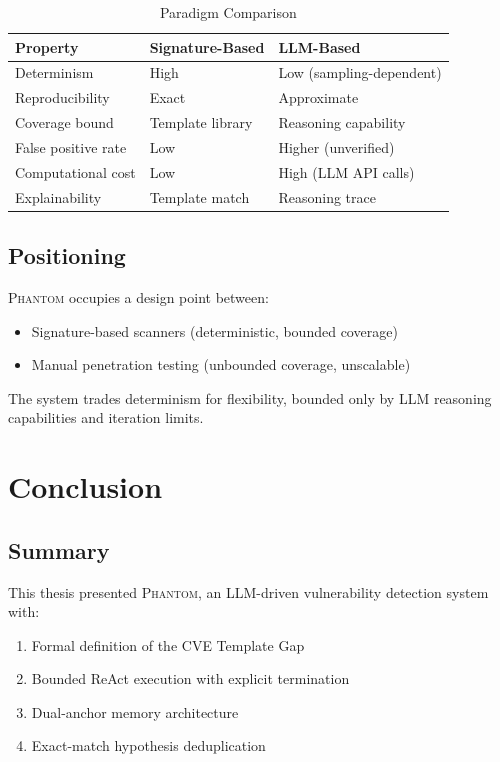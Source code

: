 \documentclass[11pt,a4paper]{article}
\theoremstyle{definition}
\newcommand{\phantom}{\textsc{Phantom}}
\begin{document}
\begin{table}[H]
\centering
\caption{Paradigm Comparison}
\label{tab:comparison}
\begin{tabularx}{\textwidth}{@{}l X X@{}}
\toprule
\textbf{Property} & \textbf{Signature-Based} & \textbf{LLM-Based} \\
\midrule
Determinism & High & Low (sampling-dependent) \\
Reproducibility & Exact & Approximate \\
Coverage bound & Template library & Reasoning capability \\
False positive rate & Low & Higher (unverified) \\
Computational cost & Low & High (LLM API calls) \\
Explainability & Template match & Reasoning trace \\
\bottomrule
\end{tabularx}
\end{table}

\subsection{Positioning}

\phantom{} occupies a design point between:
\begin{itemize}[leftmargin=*]
    \item Signature-based scanners (deterministic, bounded coverage)
    \item Manual penetration testing (unbounded coverage, unscalable)
\end{itemize}

The system trades determinism for flexibility, bounded only by LLM reasoning capabilities and iteration limits.

\section{Conclusion}
\label{sec:conclusion}

\subsection{Summary}

This thesis presented \phantom{}, an LLM-driven vulnerability detection system with:
\begin{enumerate}[leftmargin=*]
    \item Formal definition of the CVE Template Gap
    \item Bounded ReAct execution with explicit termination
    \item Dual-anchor memory architecture
    \item Exact-match hypothesis deduplication
\end{enumerate}
\end{document}
